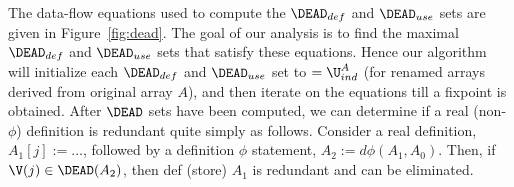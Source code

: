 The data-flow equations used to compute the $\DEAD_{def}$ and $\DEAD_{use}$ sets are given in Figure~\ref{fig:dead}.
The goal of our analysis is to find the maximal $\DEAD_{def}$ and $\DEAD_{use}$ sets that satisfy these
equations.  Hence our algorithm will initialize each 
$\DEAD_{def}$ and $\DEAD_{use}$
set to
$= \U^A_{ind}$
(for renamed arrays derived from original array $A$),
and then iterate on the equations till a fixpoint
is obtained.
After $\DEAD$ sets have been computed, we can determine if a real (non-$\phi$)
definition is redundant quite simply as follows.
Consider a real definition, $A_1[j] := \ldots$, followed by a definition
$\phi$ statement, $A_2 := d\phi(A_1,A_0)$.
Then, if $\V(j) \in \DEAD(A_2)$, then def (store) $A_1$ is redundant and can
be eliminated.
